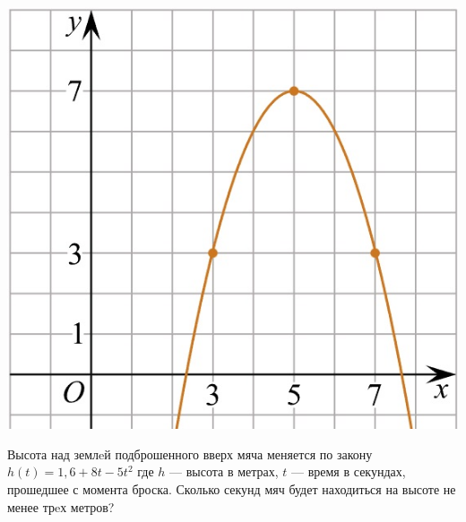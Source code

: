 \begin{class}[number=5]
\begin{listofex}
\begin{minipage}[t]{0.22\textwidth}
			\includegraphics[width=\textwidth]{pics/G101M4H2-5.jpg}
		\end{minipage}
		\item Высота над землeй подброшенного вверх мяча меняется по закону \(h(t)=1,6+8t-5t^2\) где \(h\) --- высота в метрах, \(t\) --- время в секундах, прошедшее с момента броска. Сколько секунд мяч будет
		находиться на высоте не менее трeх метров?
		\item {}

\end{listofex}
\end{class}
